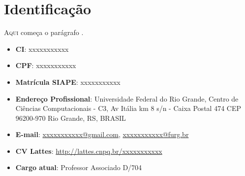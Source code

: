 \chapter{Identificação}

\lettrine[lines=2, lhang=0.33, loversize=0.25, findent=1.5em]{A}{qui} começa o parágrafo
\lipsum[7]. 

\begin{itemize}
\item \textbf{CI}: xxxxxxxxxxx
\item \textbf{CPF}: xxxxxxxxxxx
\item \textbf{Matrícula SIAPE}: xxxxxxxxxxx
\item \textbf{Endereço Profissional}: Universidade Federal do Rio Grande, Centro de Ciências Computacionais - C3, Av Itália km 8 s/n - Caixa Postal 474 CEP 96200-970 Rio Grande, RS, BRASIL
\item \textbf{E-mail}: \url{xxxxxxxxxxx@gmail.com}, \url{xxxxxxxxxxx@furg.br}
\item \textbf{CV Lattes}: \url{http://lattes.cnpq.br/xxxxxxxxxxx}
\item \textbf{Cargo atual}: Professor Associado D/704


\end{itemize}

